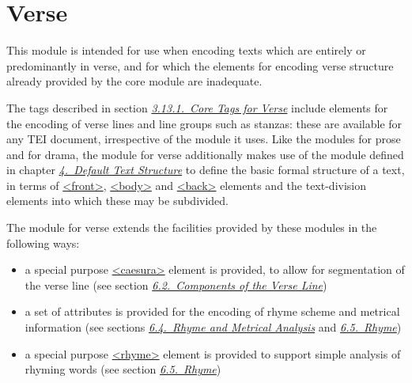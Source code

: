 
\section[{Verse}]{Verse}\label{VE}\par
This module is intended for use when encoding texts which are entirely or predominantly in verse, and for which the elements for encoding verse structure already provided by the core module are inadequate.\par
The tags described in section \textit{\hyperref[COVE]{3.13.1.\ Core Tags for Verse}} include elements for the encoding of verse lines and line groups such as stanzas: these are available for any TEI document, irrespective of the module it uses. Like the modules for prose and for drama, the module for verse additionally makes use of the module defined in chapter \textit{\hyperref[DS]{4.\ Default Text Structure}} to define the basic formal structure of a text, in terms of \hyperref[TEI.front]{<front>}, \hyperref[TEI.body]{<body>} and \hyperref[TEI.back]{<back>} elements and the text-division elements into which these may be subdivided.\par
The module for verse extends the facilities provided by these modules in the following ways: \begin{itemize}
\item a special purpose \hyperref[TEI.caesura]{<caesura>} element is provided, to allow for segmentation of the verse line (see section \textit{\hyperref[VESE]{6.2.\ Components of the Verse Line}})
\item a set of attributes is provided for the encoding of rhyme scheme and metrical information (see sections \textit{\hyperref[VEME]{6.4.\ Rhyme and Metrical Analysis}} and \textit{\hyperref[VERH]{6.5.\ Rhyme}})
\item a special purpose \hyperref[TEI.rhyme]{<rhyme>} element is provided to support simple analysis of rhyming words (see section \textit{\hyperref[VERH]{6.5.\ Rhyme}})
\end{itemize} 

